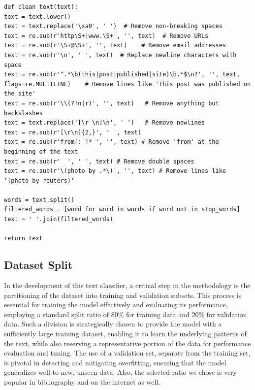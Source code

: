 \begin{lstlisting}
def clean_text(text):
text = text.lower()
text = text.replace('\xa0', ' ')  # Remove non-breaking spaces 
text = re.sub(r'http\S+|www.\S+', '', text)  # Remove URLs
text = re.sub(r'\S+@\S+', '', text)    # Remove email addresses
text = re.sub(r'\n', ' ', text)  # Replace newline characters with space 
text = re.sub(r'^.*\b(this|post|published|site)\b.*$\n?', '', text, flags=re.MULTILINE)    # Remove lines like 'This post was published on the site'
text = re.sub(r'\\(?!n|r)', '', text)   # Remove anything but backslashes
text = text.replace('[\r \n]\n', ' ')   # Remove newlines 
text = re.sub(r'[\r\n]{2,}', ' ', text)
text = re.sub(r'from[: ]* ', '', text) # Remove 'from' at the beginning of the text
text = re.sub(r'  ', ' ', text) # Remove double spaces 
text = re.sub(r'\(photo by .*\)', '', text) # Remove lines like '(photo by reuters)' 

words = text.split()
filtered_words = [word for word in words if word not in stop_words]
text = ' '.join(filtered_words)
	
return text
\end{lstlisting}

\subsection{Dataset Split}
In the development of this text classifier, a critical step in the methodology is the partitioning of the dataset into training and validation subsets.
This process is essential for training the model effectively and evaluating its performance, employing a standard split ratio of $80\%$ for training data and $20\%$ for validation data.
Such a division is strategically chosen to provide the model with a sufficiently large training dataset, enabling it to learn the underlying patterns of the text, while also reserving a representative portion of the data for performance evaluation and tuning.
The use of a validation set, separate from the training set, is pivotal in detecting and mitigating overfitting, ensuring that the model generalizes well to new, unseen data.
Also, the selected ratio we chose is very popular in bibliography and on the internet as well.

